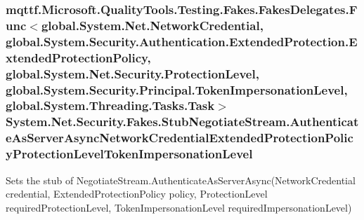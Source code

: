 \hypertarget{class_system_1_1_net_1_1_security_1_1_fakes_1_1_stub_negotiate_stream_adff4c08f77b073885df2675dee424844}{
\subsubsection[{Authenticate\-As\-Server\-Async\-Network\-Credential\-Extended\-Protection\-Policy\-Protection\-Level\-Token\-Impersonation\-Level}]{\setlength{\rightskip}{0pt plus 5cm}mqttf.\-Microsoft.\-Quality\-Tools.\-Testing.\-Fakes.\-Fakes\-Delegates.\-Func$<$global.\-System.\-Net.\-Network\-Credential, global.\-System.\-Security.\-Authentication.\-Extended\-Protection.\-Extended\-Protection\-Policy, global.\-System.\-Net.\-Security.\-Protection\-Level, global.\-System.\-Security.\-Principal.\-Token\-Impersonation\-Level, global.\-System.\-Threading.\-Tasks.\-Task$>$ System.\-Net.\-Security.\-Fakes.\-Stub\-Negotiate\-Stream.\-Authenticate\-As\-Server\-Async\-Network\-Credential\-Extended\-Protection\-Policy\-Protection\-Level\-Token\-Impersonation\-Level}}\label{class_system_1_1_net_1_1_security_1_1_fakes_1_1_stub_negotiate_stream_adff4c08f77b073885df2675dee424844}


Sets the stub of Negotiate\-Stream.\-Authenticate\-As\-Server\-Async(\-Network\-Credential credential, Extended\-Protection\-Policy policy, Protection\-Level required\-Protection\-Level, Token\-Impersonation\-Level required\-Impersonation\-Level)

